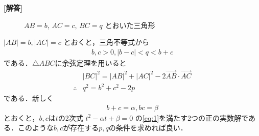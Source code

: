 \documentclass[../../main.tex]{subfiles}
\begin{document}
\begin{oframed}
  
\end{oframed}

{\bf [解答]}

\begin{figure}[htbp]
  \centering
  \caption{$AB=b$, $AC=c$, $BC=q$ とおいた三角形}
\end{figure}

$|AB|=b, |AC|=c$ とおくと，三角不等式から
\begin{align}
  b, c >0, |b-c| < q < b+c \label{eq:1}
\end{align}
である．$\triangle ABC$に余弦定理を用いると
\begin{align}
  & |BC|^2 = |AB|^2 + |AC|^2 - 2\overrightarrow{AB}\cdot\overrightarrow{AC} \\
  \therefore
  &  q^2 = b^2 + c^2 - 2p \label{eq:2}
\end{align}
である．新しく
\begin{align}
  b+c = \alpha, bc = \beta \label{eq:3}
\end{align}
とおくと，$b,c$は$t$の2次式 $t^2 - \alpha t + \beta = 0$ の\cref{eq:1}を満たす2つの正の実数解である．このような$b,c$が存在する$p,q$の条件を求めれば良い．
\end{document}
